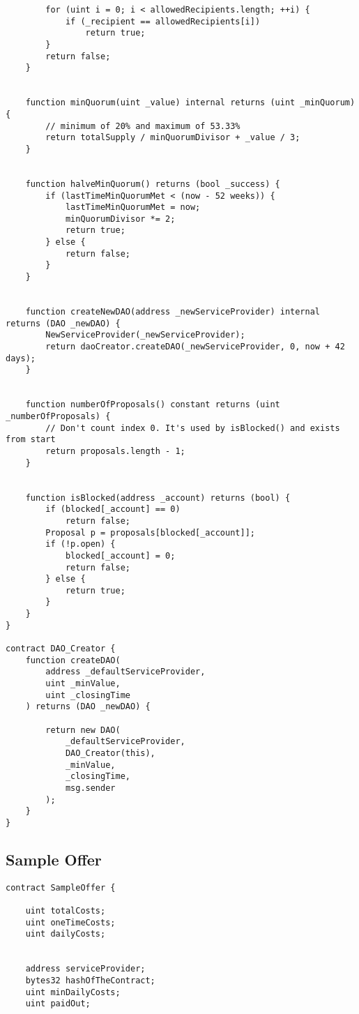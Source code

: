 \documentclass[9pt,oneside]{amsart}
\begin{document}
\begin{appendix}
\begin{verbatim}
        for (uint i = 0; i < allowedRecipients.length; ++i) {
            if (_recipient == allowedRecipients[i])
                return true;
        }
        return false;
    }


    function minQuorum(uint _value) internal returns (uint _minQuorum) {
        // minimum of 20% and maximum of 53.33%
        return totalSupply / minQuorumDivisor + _value / 3;
    }


    function halveMinQuorum() returns (bool _success) {
        if (lastTimeMinQuorumMet < (now - 52 weeks)) {
            lastTimeMinQuorumMet = now;
            minQuorumDivisor *= 2;
            return true;
        } else {
            return false;
        }
    }


    function createNewDAO(address _newServiceProvider) internal returns (DAO _newDAO) {
        NewServiceProvider(_newServiceProvider);
        return daoCreator.createDAO(_newServiceProvider, 0, now + 42 days);
    }


    function numberOfProposals() constant returns (uint _numberOfProposals) {
        // Don't count index 0. It's used by isBlocked() and exists from start
        return proposals.length - 1;
    }


    function isBlocked(address _account) returns (bool) {
        if (blocked[_account] == 0)
            return false;
        Proposal p = proposals[blocked[_account]];
        if (!p.open) {
            blocked[_account] = 0;
            return false;
        } else {
            return true;
        }
    }
}

contract DAO_Creator {
    function createDAO(
        address _defaultServiceProvider,
        uint _minValue,
        uint _closingTime
    ) returns (DAO _newDAO) {

        return new DAO(
            _defaultServiceProvider,
            DAO_Creator(this),
            _minValue,
            _closingTime,
            msg.sender
        );
    }
}
\end{verbatim}

\subsection{Sample Offer}\label{app:SampleOffer}
\begin{verbatim}
contract SampleOffer {

    uint totalCosts;
    uint oneTimeCosts;
    uint dailyCosts;


    address serviceProvider;
    bytes32 hashOfTheContract;
    uint minDailyCosts;
    uint paidOut;


\end{verbatim}
\end{appendix}
\end{document}
